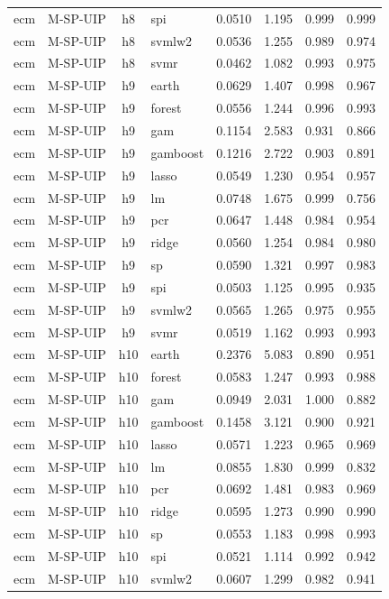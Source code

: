 \begin{ThreePartTable}
\begin{longtable}[t]{llclcccc}
ecm & M-SP-UIP & h8 & spi & 0.0510 & 1.195 & 0.999 & 0.999\\
ecm & M-SP-UIP & h8 & svmlw2 & 0.0536 & 1.255 & 0.989 & 0.974\\
ecm & M-SP-UIP & h8 & svmr & 0.0462 & 1.082 & 0.993 & 0.975\\
\addlinespace
ecm & M-SP-UIP & h9 & earth & 0.0629 & 1.407 & 0.998 & 0.967\\
ecm & M-SP-UIP & h9 & forest & 0.0556 & 1.244 & 0.996 & 0.993\\
ecm & M-SP-UIP & h9 & gam & 0.1154 & 2.583 & 0.931 & 0.866\\
ecm & M-SP-UIP & h9 & gamboost & 0.1216 & 2.722 & 0.903 & 0.891\\
ecm & M-SP-UIP & h9 & lasso & 0.0549 & 1.230 & 0.954 & 0.957\\
ecm & M-SP-UIP & h9 & lm & 0.0748 & 1.675 & 0.999 & 0.756\\
ecm & M-SP-UIP & h9 & pcr & 0.0647 & 1.448 & 0.984 & 0.954\\
ecm & M-SP-UIP & h9 & ridge & 0.0560 & 1.254 & 0.984 & 0.980\\
ecm & M-SP-UIP & h9 & sp & 0.0590 & 1.321 & 0.997 & 0.983\\
ecm & M-SP-UIP & h9 & spi & 0.0503 & 1.125 & 0.995 & 0.935\\
ecm & M-SP-UIP & h9 & svmlw2 & 0.0565 & 1.265 & 0.975 & 0.955\\
ecm & M-SP-UIP & h9 & svmr & 0.0519 & 1.162 & 0.993 & 0.993\\
\addlinespace
ecm & M-SP-UIP & h10 & earth & 0.2376 & 5.083 & 0.890 & 0.951\\
ecm & M-SP-UIP & h10 & forest & 0.0583 & 1.247 & 0.993 & 0.988\\
ecm & M-SP-UIP & h10 & gam & 0.0949 & 2.031 & 1.000 & 0.882\\
ecm & M-SP-UIP & h10 & gamboost & 0.1458 & 3.121 & 0.900 & 0.921\\
ecm & M-SP-UIP & h10 & lasso & 0.0571 & 1.223 & 0.965 & 0.969\\
ecm & M-SP-UIP & h10 & lm & 0.0855 & 1.830 & 0.999 & 0.832\\
ecm & M-SP-UIP & h10 & pcr & 0.0692 & 1.481 & 0.983 & 0.969\\
ecm & M-SP-UIP & h10 & ridge & 0.0595 & 1.273 & 0.990 & 0.990\\
ecm & M-SP-UIP & h10 & sp & 0.0553 & 1.183 & 0.998 & 0.993\\
ecm & M-SP-UIP & h10 & spi & 0.0521 & 1.114 & 0.992 & 0.942\\
ecm & M-SP-UIP & h10 & svmlw2 & 0.0607 & 1.299 & 0.982 & 0.941\\

\end{longtable}
\end{ThreePartTable}
